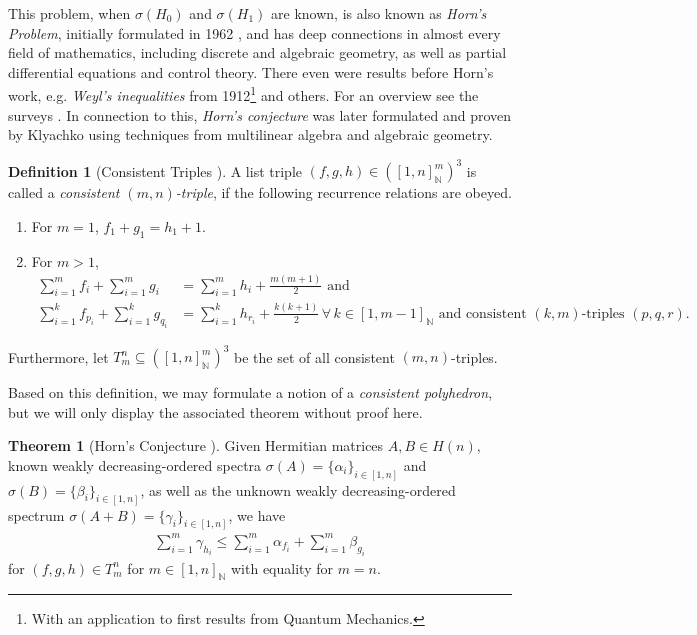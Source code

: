 \documentclass[10pt]{amsart}
\theoremstyle{definition}
\newtheorem{theorem}{Theorem}
\newtheorem{definition}{Definition}
\theoremstyle{remark}
\begin{document}
    \phantom{}
    
    This problem, when \(\sigma(H_0)\) and \(\sigma(H_1)\) are known, is also known as \emph{Horn's Problem}, initially formulated in 1962 \cite{Horn_1962}, and has deep connections in almost every field of mathematics, including discrete and algebraic geometry, as well as partial differential equations and control theory. There even were results before Horn's work, e.g. \emph{Weyl's inequalities} from 1912\footnote{With an application to first results from Quantum Mechanics.} \cite{Weyl_1912} \cite[p. 3]{Fulton_2000} and others. For an overview see the surveys \cite{Day_1998, Fulton_2000, Coquereaux_2019}. In connection to this, \emph{Horn's conjecture} was later formulated and proven by Klyachko \cite{Klyachko_1998} using techniques from multilinear algebra and algebraic geometry.

    \begin{definition}[{Consistent Triples \cite[pp. 290-291]{Day_1998}}]
        A list triple \((f, g, h) \in ([1, n]_{\mathbb{N}}^m)^3\) is called a \emph{consistent \((m, n)\)-triple}, if the following recurrence relations are obeyed.
        \begin{enumerate}[label=\arabic*.]
            \item For \(m = 1\), \(f_1 + g_1 = h_1 + 1\).
            \item For \(m > 1\),
            \begin{align}
                \sum_{i=1}^m f_i + \sum_{i=1}^m g_i &= \sum_{i=1}^m h_i + \frac{m(m+1)}{2} \text{ and }\\
                \sum_{i=1}^k f_{p_i} + \sum_{i=1}^k g_{q_i} &= \sum_{i=1}^k h_{r_i} + \frac{k(k+1)}{2} \, \forall \, k \in [1, m-1]_{\mathbb{N}} \text{ and consistent }(k, m)\text{-triples } (p, q, r).
            \end{align}
        \end{enumerate}
        Furthermore, let \(T_m^n \subseteq ([1, n]_{\mathbb{N}}^m)^3\) be the set of all consistent \((m, n)\)-triples.
    \end{definition}

    Based on this definition, we may formulate a notion of a \emph{consistent polyhedron}, but we will only display the associated theorem without proof here.

    \begin{theorem}[{Horn's Conjecture \cite[p. 291]{Day_1998} \cite{Klyachko_1998}}]
        Given Hermitian matrices \(A, B \in H(n)\), known weakly decreasing-ordered spectra \(\sigma(A) = \{\alpha_i\}_{i \in [1, n]}\) and \(\sigma(B) = \{\beta_i\}_{i \in [1, n]}\), as well as the unknown weakly decreasing-ordered spectrum \(\sigma(A+B) = \{\gamma_i\}_{i \in [1, n]}\), we have
        \begin{align}
            \sum_{i=1}^m \gamma_{h_i} \leq \sum_{i=1}^m \alpha_{f_i} + \sum_{i=1}^m \beta_{g_i}
        \end{align}
        for \((f, g, h) \in T_m^n\) for \(m \in [1, n]_{\mathbb{N}}\) with equality for \(m=n\).
    \end{theorem}
\end{document}
